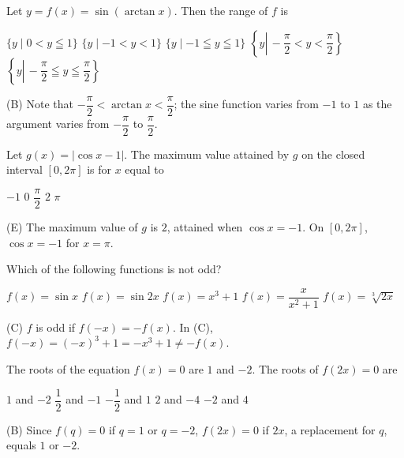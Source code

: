 \question
Let $y=f(x)=\sin (\arctan x)$. Then the range of $f$ is
\begin{choices}
  \choice $\{y \mid 0<y \leqq 1\}$
  \CorrectChoice $\{y \mid-1<y<1\}$
  \choice $\{y \mid-1 \leqq y \leqq 1\}$
  \choice $\left\{y \left\lvert\,-\dfrac{\pi}{2}<y<\dfrac{\pi}{2}\right.\right\}$
  \choice $\left\{y \left\lvert\,-\dfrac{\pi}{2} \leqq y \leqq \dfrac{\pi}{2}\right.\right\}$
\end{choices}
\begin{solution}
(B) Note that $-\dfrac{\pi}{2}<\arctan x<\dfrac{\pi}{2}$; the sine function varies from $-1$ to $1$ as the argument varies from $-\dfrac{\pi}{2}$ to $\dfrac{\pi}{2}$.
\end{solution}

\question
Let $g(x)=|\cos x-1|$. The maximum value attained by $g$ on the closed interval $[0,2 \pi]$ is for $x$ equal to
\begin{choices}
  \choice $-1$
  \choice $0$
  \choice $\dfrac{\pi}{2}$
  \choice $2$
  \CorrectChoice $\pi$
\end{choices}
\begin{solution}
(E) The maximum value of $g$ is $2$, attained when $\cos x=-1$. On $[0,2 \pi]$, $\cos x=-1$ for $x=\pi$.
\end{solution}




\newpage



\question
Which of the following functions is not odd?
\begin{choices}
  \choice $f(x)=\sin x$
  \choice $f(x)=\sin 2 x$
  \CorrectChoice $f(x)=x^{3}+1$
  \choice $f(x)=\dfrac{x}{x^{2}+1}$
  \choice $f(x)=\sqrt[3]{2 x}$
\end{choices}
\begin{solution}
(C) $f$ is odd if $f(-x)=-f(x)$. In (C), $f(-x)=(-x)^{3}+1=-x^{3}+1 \neq-f(x)$.
\end{solution}

\question
The roots of the equation $f(x)=0$ are $1$ and $-2$. The roots of $f(2 x)=0$ are
\begin{choices}
  \choice $1$ and $-2$
  \CorrectChoice $\dfrac{1}{2}$ and $-1$
  \choice $-\dfrac{1}{2}$ and $1$
  \choice $2$ and $-4$
  \choice $-2$ and $4$
\end{choices}
\begin{solution}
(B) Since $f(q)=0$ if $q=1$ or $q=-2$, $f(2 x)=0$ if $2 x$, a replacement for $q$, equals $1$ or $-2$.
\end{solution}

